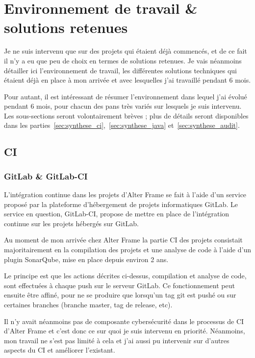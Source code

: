 \section{Environnement de travail \& solutions retenues}
Je ne suis intervenu que sur des projets qui étaient déjà commencés, et de ce fait il n'y a eu que peu de choix en termes de solutions retenues. Je vais néanmoins détailler ici l'environnement de travail, les différentes solutions techniques qui étaient déjà en place à mon arrivée et avec lesquelles j'ai travaillé pendant 6 mois.

Pour autant, il est intéressant de résumer l'environnement dans lequel j'ai évolué pendant 6 mois, pour chacun des pans très variés sur lesquels je suis intervenu. Les sous-sections seront volontairement brèves ; plus de détails seront disponibles dans les parties~\ref{sec:synthese_ci},~\ref{sec:synthese_java} et~\ref{sec:synthese_audit}.

\subsection{CI}
\subsubsection{GitLab \& GitLab-CI}
L'intégration continue dans les projets d'Alter Frame se fait à l'aide d'un service proposé par la plateforme d'hébergement de projets informatiques GitLab\cite{gitlab}. Le service en question, GitLab-CI\cite{gitlab-ci}, propose de mettre en place de l'intégration continue sur les projets hébergés sur GitLab.

Au moment de mon arrivée chez Alter Frame la partie CI des projets consistait majoritairement en la compilation des projets et une analyse de code à l'aide d'un plugin SonarQube\cite{sonarqube}, mise en place depuis environ 2 ans.

Le principe est que les actions décrites ci-dessus, compilation et analyse de code, sont effectuées à chaque push sur le serveur GitLab. Ce fonctionnement peut ensuite être affiné, pour ne se produire que lorsqu'un tag git est pushé ou sur certaines branches (branche master, tag de release, etc).

Il n'y avait néanmoins pas de composante cybersécurité dans le processus de CI d'Alter Frame et c'est donc ce sur quoi je suis intervenu en priorité. Néanmoins, mon travail ne s'est pas limité à cela et j'ai aussi pu intervenir sur d'autres aspects du CI et améliorer l'existant.

